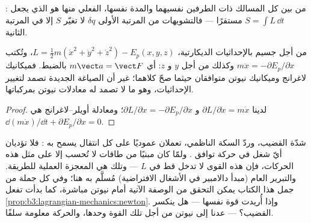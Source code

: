 \begin{omfigure}

{\small {}: من بين كل المسالك ذات الطرفين نفسيهما
والمدة نفسها، الفعلي منها هو الذي يجعل $S = \int L\,\dd t$ مستقرًا
--- فالتشويهات من المرتبة الأولى $\delta q$ لا تغيّر $S$ إلا في
المرتبة الثانية.}
\end{omfigure}

\begin{proposition}\label{prop:b3:lagrangian-mechanics:newton}
من أجل جسيم بالإحداثيات الديكارتية، $L = \tfrac12 m(\dot x^2 +
\dot y^2 + \dot z^2) - E_p(x,y,z)$، وتُكتب 
$m\ddot x = -\partial E_p/\partial x$ وكذلك من أجل $y$ و $z$: أي
$m\vect a = \vect F$ بالضبط. فميكانيك لاغرانج وميكانيك نيوتن
متوافقان حيثما صحّ كلاهما؛ غير أن الصياغة الجديدة تصمد لتغيير
الإحداثيات، وهو ما لا تصمد له معادلات نيوتن بمركباتها.
\end{proposition}

\begin{proof}
لدينا $\partial L/\partial\dot x = m\dot x$ و $\partial L/\partial x =
-\partial E_p/\partial x$؛ ومعادلة أويلر--لاغرانج هي
$\dd(m\dot x)/\dd t + \partial E_p/\partial x = 0$.
\end{proof}

\begin{remark}\label{rem:b3:lagrangian-mechanics:constraints}
شدّة القضيب، وردّ  السكة الناظمي، تعملان عموديًا على كل انتقال
يسمح به : فلا تؤديان أيّ شغل في حركة توافق . ولمّا كان
 مبنيًا من طاقات لا تُحسب إلا على مثل هذه الحركات، فإن هذه
القوى لا تدخل قط في $L$ --- وتلك هي المعجزة العملية للطريقة.
والتبرير العام (مبدأ دالامبير في الأشغال الافتراضية) مُسلَّم به
هنا؛ وفي كل جملة من جمل هذا الكتاب يمكن التحقق من الوصفة الآتية
أمام نيوتن مباشرة، كما بدأت تفعل
\cref{prop:b3:lagrangian-mechanics:newton}. وإذا أُريدت قوة 
نفسها --- هل ينكسر القضيب؟ --- عدنا إلى نيوتن من أجل تلك القوة
وحدها، والحركة معلومة سلفًا.
\end{remark}

